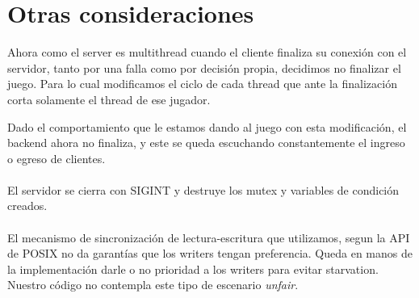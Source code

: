 \section{Otras consideraciones}

Ahora como el server es multithread cuando el cliente finaliza su conexi\'on con el servidor, tanto por una falla como por decisi\'on propia, decidimos no finalizar el juego. Para lo cual modificamos el ciclo de cada thread que ante la finalizaci\'on corta solamente el thread de ese jugador.

Dado el comportamiento que le estamos dando al juego con esta modificaci\'on, el backend ahora no finaliza, y este se queda escuchando constantemente el ingreso o egreso de clientes.

\paragraph{}
El servidor se cierra con SIGINT y destruye los mutex y variables de condici\'on creados.

\paragraph{}
El mecanismo de sincronizaci\'on de lectura-escritura que utilizamos, segun la API de POSIX no da garant\'ias que los writers tengan preferencia. Queda en manos de la implementaci\'on darle o no prioridad a los writers para evitar starvation. Nuestro c\'odigo no contempla este tipo de escenario \textit{unfair}.